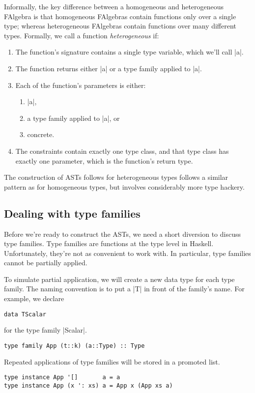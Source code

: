 \documentclass[preprint]{sigplanconf}
\theoremstyle{definition}
\begin{document}
Informally, the key difference between a homogeneous and heterogeneous FAlgebra is that homogeneous FAlgebras contain functions only over a single type; whereas heterogeneous FAlgebras contain functions over many different types.
Formally, we call a function \emph{heterogeneous} if:
\begin{enumerate}
\item
The function's signature contains a single type variable, which we'll call |a|.
\item
The function returns either |a| or a type family applied to |a|.
\item
Each of the function's parameters is either:
\begin{enumerate}
\item
|a|,
\item
a type family applied to |a|, or
\item
concrete.
\end{enumerate}
\item
The constraints contain exactly one type class, and
that type class has exactly one parameter,
which is the function's return type.
\end{enumerate}
The construction of ASTs follows for heterogeneous types follows a similar pattern as for homogeneous types, but involves considerably more type hackery.

\subsection{Dealing with type families}
Before we're ready to construct the ASTs, we need a short diversion to discuss type families.
Type families are functions at the type level in Haskell.
Unfortunately, they're not as convenient to work with.
In particular, type families cannot be partially applied.

To simulate partial application, we will create a new data type for each type family.
The naming convention is to put a |T| in front of the family's name.
For example, we declare
\begin{lstlisting}
data TScalar
\end{lstlisting}
for the type family |Scalar|.
\begin{lstlisting}
type family App (t::k) (a::Type) :: Type
\end{lstlisting}

Repeated applications of type families will be stored in a promoted list.
\begin{lstlisting}
type instance App '[]       a = a
type instance App (x ': xs) a = App x (App xs a)
\end{lstlisting}
\end{document}
